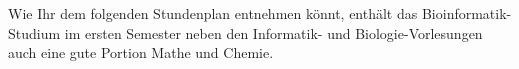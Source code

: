 Wie Ihr dem folgenden Stundenplan entnehmen könnt, enthält das Bioinformatik-Studium im ersten
Semester neben den Informatik- und Biologie-Vorlesungen auch eine gute Portion Mathe und Chemie.
\vspace{-1cm}
\begin{center}


\end{center}
